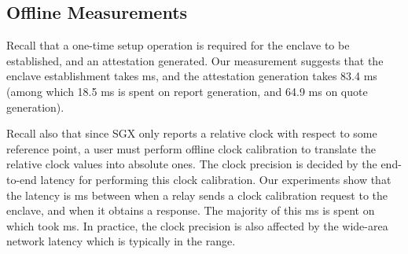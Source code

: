 
\subsection{Offline Measurements}



Recall that a one-time setup operation is required 
for the enclave to be established, and an attestation generated. 
Our measurement suggests that the enclave establishment takes
 ms, 
and the attestation generation takes 
83.4 ms (among which 
18.5 ms is spent 
on report generation, 
and 64.9 ms on quote generation).

Recall also that since SGX only reports a relative clock
with respect to some reference point,  
a user must perform offline clock calibration 
to translate the  relative clock values into absolute ones.
The clock precision is decided
by the end-to-end latency for performing 
this clock calibration. 
Our experiments show that the latency is  ms 
between when a relay sends a clock calibration request
to the enclave, and when it obtains a response.
The majority of this  ms is spent on
which took  ms.
In practice, the clock precision is also affected
by the wide-area network latency
which is typically in the  range.

%
%
%
%
%
